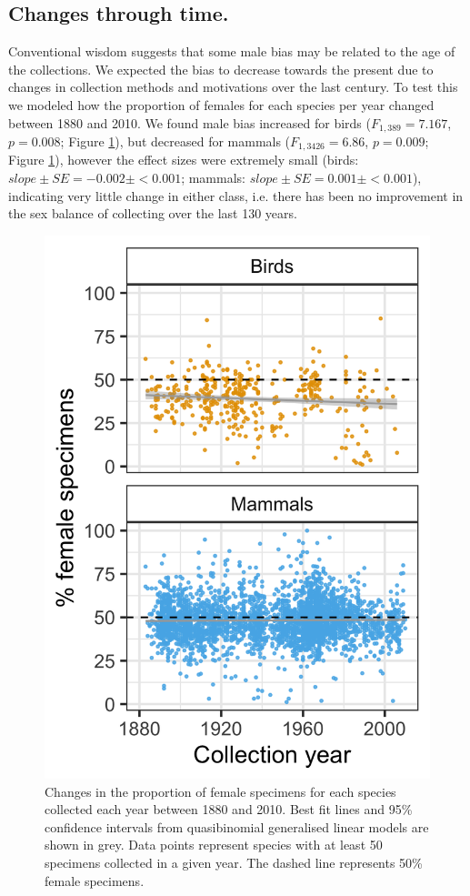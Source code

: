 \documentclass[a4paper, 12pt]{article}
\begin{document}
\subsection{Changes through time.}
Conventional wisdom suggests that some male bias may be related to the age of the collections. 
We expected the bias to decrease towards the present due to changes in collection methods and motivations over the last century. 
To test this we modeled how the proportion of females for each species per year changed between 1880 and 2010. 
We found male bias increased for birds ($F_{1, 389} = 7.167$, $p = 0.008$; Figure \ref{fig-time}), but decreased for mammals ($F_{1, 3426} = 6.86$, $p = 0.009$; Figure \ref{fig-time}), however the effect sizes were extremely small (birds: $slope \pm SE = -0.002 \pm < 0.001$; mammals: $slope \pm SE = 0.001 \pm < 0.001$), indicating very little change in either class, i.e. there has been no improvement in the sex balance of collecting over the last 130 years.

\begin{figure}
 \centering
  \includegraphics[width = \linewidth]{figures/years-all.png}
  \caption{Changes in the proportion of female specimens for each species collected each year between 1880 and 2010. 
  Best fit lines and 95\% confidence intervals from quasibinomial generalised linear models are shown in grey. 
  Data points represent species with at least 50 specimens collected in a given year. 
  The dashed line represents 50\% female specimens.
}
  \label{fig-time}
\end{figure}
\end{document}
